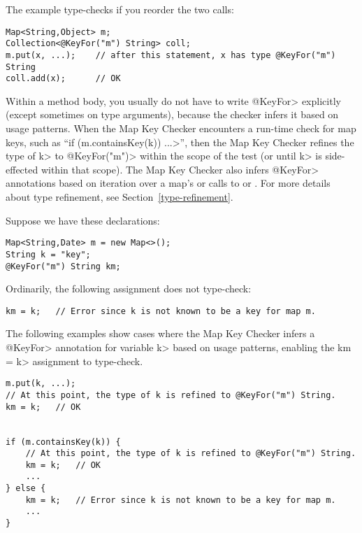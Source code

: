\noindent
The example type-checks if you reorder the two calls:

\begin{verbatim}
Map<String,Object> m;
Collection<@KeyFor("m") String> coll;
m.put(x, ...);    // after this statement, x has type @KeyFor("m") String
coll.add(x);      // OK
\end{verbatim}




Within a method body, you usually do not have to write \<@KeyFor>
explicitly (except sometimes on type arguments),
because the checker infers it based on usage patterns.  When the Map Key
Checker encounters a run-time check for map keys, such as
``\<if (m.containsKey(k)) ...>'', then the Map Key Checker refines the type of
\<k> to \<@KeyFor("m")> within the scope of the test (or until \<k> is
side-effected within that scope).  The Map Key Checker also infers \<@KeyFor>
annotations based on iteration over a map's
 or calls to
or
.
For more details about type refinement, see Section~\ref{type-refinement}.

Suppose we have these declarations:

\begin{verbatim}
Map<String,Date> m = new Map<>();
String k = "key";
@KeyFor("m") String km;
\end{verbatim}

Ordinarily, the following assignment does not type-check:

\begin{verbatim}
km = k;   // Error since k is not known to be a key for map m.
\end{verbatim}

The following examples show cases where the Map Key Checker
infers a \<@KeyFor> annotation for variable \<k> based on usage patterns,
enabling the \<km = k> assignment to type-check.


\begin{verbatim}
m.put(k, ...);
// At this point, the type of k is refined to @KeyFor("m") String.
km = k;   // OK


if (m.containsKey(k)) {
    // At this point, the type of k is refined to @KeyFor("m") String.
    km = k;   // OK
    ...
} else {
    km = k;   // Error since k is not known to be a key for map m.
    ...
}
\end{verbatim}


